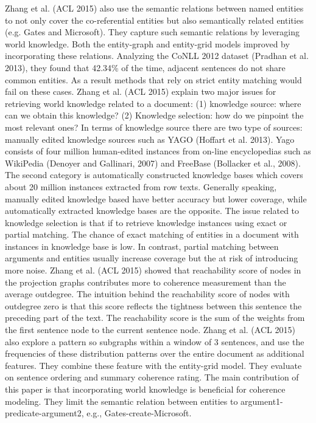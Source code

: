 Zhang et al. (ACL 2015) also use the semantic relations between named entities to not only cover the co-referential entities but also semantically related entities (e.g. Gates and Microsoft). 
They capture such semantic relations by leveraging world knowledge.
Both the entity-graph and entity-grid models improved by incorporating these relations. 
Analyzing the CoNLL 2012 dataset (Pradhan et al. 2013), they found that 42.34\% of the time, adjacent sentences do not share common entities. 
As a result methods that rely on strict entity matching would fail on these cases. 
Zhang et al. (ACL 2015) explain two major issues for retrieving world knowledge related to a document: (1) knowledge source: where can we obtain this knowledge? (2) Knowledge selection: how do we pinpoint the most relevant ones?
In terms of knowledge source there are two type of sources: manually edited knowledge sources such as YAGO (Hoffart et al. 2013).
Yago consists of four million human-edited instances from on-line encyclopedias such as WikiPedia (Denoyer and Gallinari, 2007) and FreeBase (Bollacker et al., 2008).
The second category is automatically constructed knowledge bases which covers about 20 million instances extracted from row texts. 
Generally speaking, manually edited knowledge based have better accuracy but lower coverage, while automatically extracted knowledge bases are the opposite. 
The issue related to knowledge selection is that if to retrieve knowledge instances using exact or partial matching. 
The chance of exact matching of entities in a document with instances in knowledge base is low. 
In contrast, partial matching between arguments and entities usually increase coverage but the at risk of introducing more noise. 
Zhang et al. (ACL 2015) showed that reachability score of nodes in the projection graphs contributes more to coherence measurement than the average outdegree. 
The intuition behind the reachability score of nodes with outdegree zero is that this score reflects the tightness between this sentence the preceding part of the text. 
The reachability score is the sum of the weights from the first sentence node to the current sentence node. 
Zhang et al. (ACL 2015) also explore a pattern so subgraphs within a window of 3 sentences, and use the frequencies of these distribution patterns over the entire document as additional features. 
They combine these feature with the entity-grid model. 
They evaluate on sentence ordering and summary coherence rating. 
The main contribution of this paper is that incorporating world knowledge is beneficial for coherence modeling. 
They limit the semantic relation between entities to argument1-predicate-argument2, e.g., Gates-create-Microsoft.


